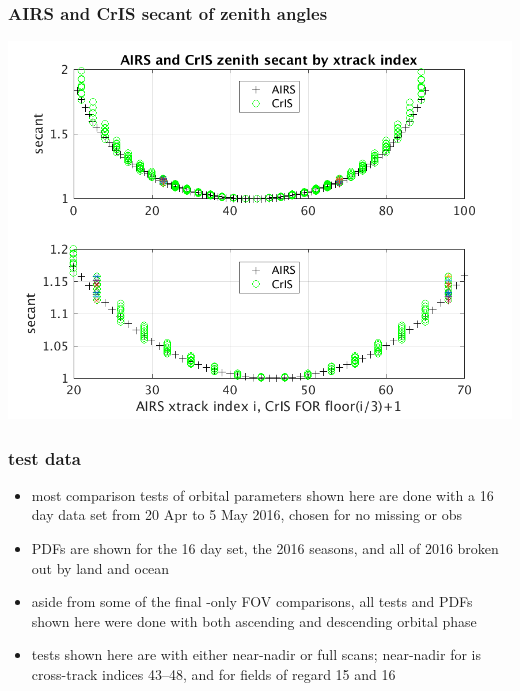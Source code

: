 \documentclass[11pt]{beamer}
\begin{document}
\begin{frame}
\frametitle{AIRS and CrIS secant of zenith angles}

\begin{center}
  \includegraphics[scale=0.7]{figures/AIRS_CrIS_secant_by_xtrack.png}
\end{center}
\end{frame} %
\begin{frame}
\frametitle{test data}

\begin{itemize}

 \item most comparison tests of orbital parameters shown here are
   done with a 16 day data set from 20 Apr to 5 May 2016, chosen for
   no missing {\airs} or {\cris} obs
 
 \item PDFs are shown for the 16 day set, the 2016 seasons, and all
   of 2016 broken out by land and ocean

 \item aside from some of the final {\cris}-only FOV comparisons,
   all tests and PDFs shown here were done with both ascending and
   descending orbital phase

 \item tests shown here are with either near-nadir or full scans;
   near-nadir for {\airs} is cross-track indices 43--48, and for
   {\cris} fields of regard 15 and 16

\end{itemize}
\end{frame}
\end{document}
